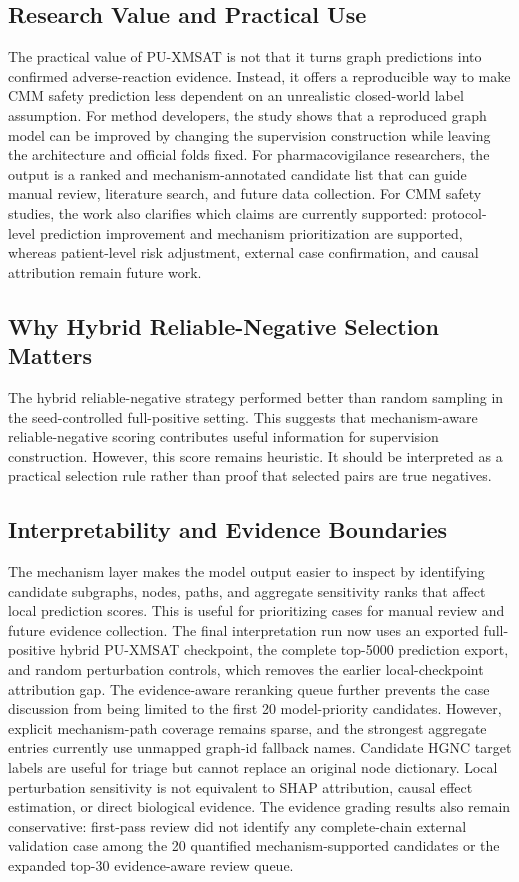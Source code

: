 \documentclass[manuscript,screen,review]{acmart}
\newcommand{\px}{PU-XMSAT}
\begin{document}
\subsection{Research Value and Practical Use}

The practical value of \px{} is not that it turns graph predictions into confirmed adverse-reaction evidence. Instead, it offers a reproducible way to make CMM safety prediction less dependent on an unrealistic closed-world label assumption. For method developers, the study shows that a reproduced graph model can be improved by changing the supervision construction while leaving the architecture and official folds fixed. For pharmacovigilance researchers, the output is a ranked and mechanism-annotated candidate list that can guide manual review, literature search, and future data collection. For CMM safety studies, the work also clarifies which claims are currently supported: protocol-level prediction improvement and mechanism prioritization are supported, whereas patient-level risk adjustment, external case confirmation, and causal attribution remain future work.

\subsection{Why Hybrid Reliable-Negative Selection Matters}

The hybrid reliable-negative strategy performed better than random sampling in the seed-controlled full-positive setting. This suggests that mechanism-aware reliable-negative scoring contributes useful information for supervision construction. However, this score remains heuristic. It should be interpreted as a practical selection rule rather than proof that selected pairs are true negatives.

\subsection{Interpretability and Evidence Boundaries}

The mechanism layer makes the model output easier to inspect by identifying candidate subgraphs, nodes, paths, and aggregate sensitivity ranks that affect local prediction scores. This is useful for prioritizing cases for manual review and future evidence collection. The final interpretation run now uses an exported full-positive hybrid \px{} checkpoint, the complete top-5000 prediction export, and random perturbation controls, which removes the earlier local-checkpoint attribution gap. The evidence-aware reranking queue further prevents the case discussion from being limited to the first 20 model-priority candidates. However, explicit mechanism-path coverage remains sparse, and the strongest aggregate entries currently use unmapped graph-id fallback names. Candidate HGNC target labels are useful for triage but cannot replace an original node dictionary. Local perturbation sensitivity is not equivalent to SHAP attribution, causal effect estimation, or direct biological evidence. The evidence grading results also remain conservative: first-pass review did not identify any complete-chain external validation case among the 20 quantified mechanism-supported candidates or the expanded top-30 evidence-aware review queue.
\end{document}
